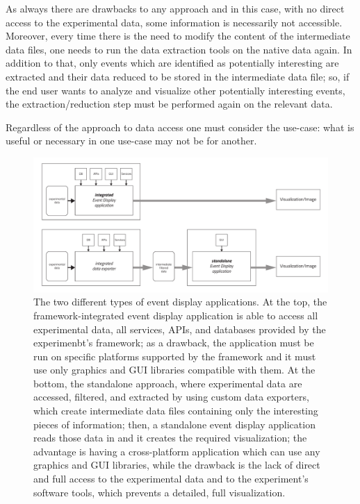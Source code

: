 \documentclass[12pt,a4paper]{article}
\begin{document}
As always there are drawbacks to any approach and in this case, with no direct access to the experimental data, some information is necessarily not accessible. Moreover, every time there is the need to modify the content of the intermediate data files, one needs to run the data extraction tools on the native data again. In addition to that, only events which are identified as potentially interesting are extracted and their data reduced to be stored in the intermediate data file; so, if the end user wants to analyze and visualize other potentially interesting events, the extraction/reduction step must be performed again on the relevant data.

Regardless of the approach to data access one must consider the use-case: what is useful or necessary in one use-case may not be for another.


\begin{figure}
	\centering
	\includegraphics[width=\linewidth]{img/eventDisplays_applications_types}
	\caption[Different types of event display applications]{The two different types of event display applications. At the top, the framework-integrated event display application is able to access all experimental data, all services, APIs, and databases provided by the experimenbt's framework; as a drawback, the application must be run on specific platforms supported by the framework and it must use only graphics and GUI libraries compatible with them. At the bottom, the standalone approach, where experimental data are accessed, filtered, and extracted by using custom data exporters, which create intermediate data files containing only the interesting pieces of information; then, a standalone event display application reads those data in and it creates the required visualization; the advantage is having a cross-platform application which can use any graphics and GUI libraries, while the drawback is the lack of direct and full access to the experimental data and to the experiment's software tools, which prevents a detailed, full visualization.}
	\label{fig:eventdisplaysapplicationstypes}
\end{figure}
\end{document}

